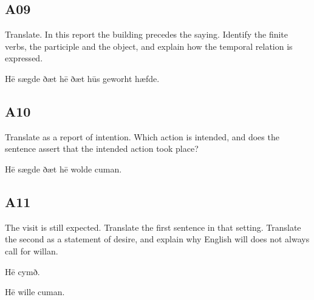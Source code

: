 \subsection*{A09}

\par\begin{minipage}{\linewidth}\raggedright
Translate. In this report the building precedes the saying. Identify the finite verbs, the participle and the object, and explain how the temporal relation is expressed.

Hē sægde ðæt hē ðæt hūs geworht hæfde.

\end{minipage}\par\addvspace{4pt}

\subsection*{A10}

\par\begin{minipage}{\linewidth}\raggedright
Translate as a report of intention. Which action is intended, and does the sentence assert that the intended action took place?

Hē sægde ðæt hē wolde cuman.

\end{minipage}\par\addvspace{4pt}

\subsection*{A11}

\par\begin{minipage}{\linewidth}\raggedright
The visit is still expected. Translate the first sentence in that setting. Translate the second as a statement of desire, and explain why English will does not always call for willan.

Hē cymð.

Hē wille cuman.

\end{minipage}\par\addvspace{4pt}

